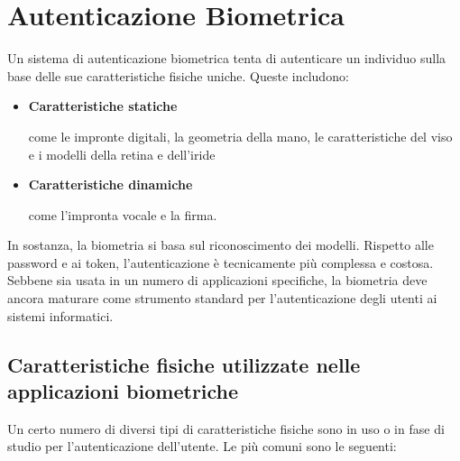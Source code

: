 \section{Autenticazione Biometrica}
Un sistema di autenticazione biometrica tenta di autenticare un individuo sulla base delle sue caratteristiche fisiche uniche. Queste includono:
\begin{itemize}
    \item \textbf{Caratteristiche statiche}
    
    come le impronte digitali, la geometria della mano, le caratteristiche del viso e i modelli della retina e dell'iride
    
    \item \textbf{Caratteristiche dinamiche}
    
    come l'impronta vocale e la firma.
\end{itemize}

In sostanza, la biometria si basa sul riconoscimento dei modelli. Rispetto alle password e ai token, l'autenticazione è tecnicamente più complessa e costosa. Sebbene sia usata in un numero di applicazioni specifiche, la biometria deve ancora maturare come strumento standard per l'autenticazione degli utenti ai sistemi informatici.

\subsection{Caratteristiche fisiche utilizzate nelle applicazioni biometriche}

Un certo numero di diversi tipi di caratteristiche fisiche sono in uso o in fase di studio per l'autenticazione dell'utente. Le più comuni sono le seguenti:

